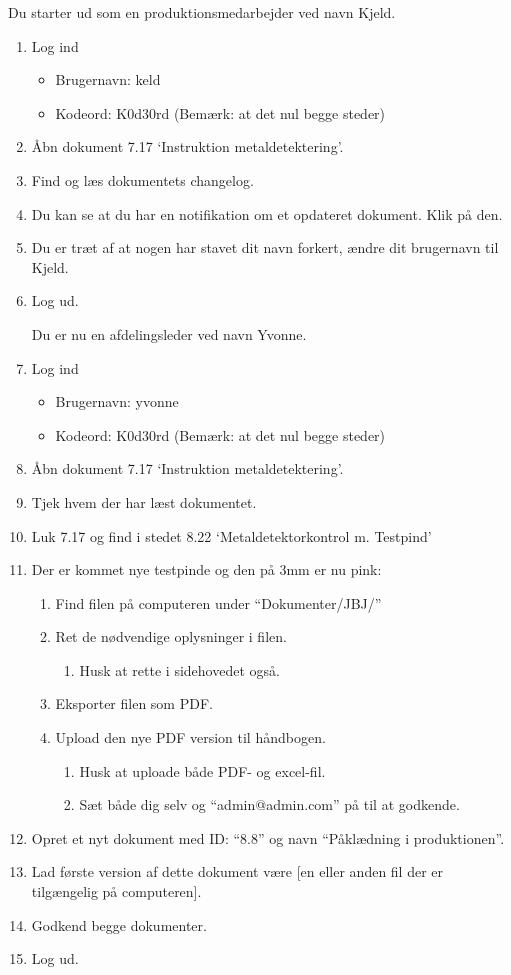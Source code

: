 Du starter ud som en produktionsmedarbejder ved navn Kjeld.
\begin{enumerate}
	\item Log ind
		\begin{itemize}
			\item Brugernavn: keld
			\item Kodeord: K0d30rd  (Bemærk: at det nul begge steder)
		\end{itemize}
	\item Åbn dokument 7.17 ‘Instruktion metaldetektering’.
	\item Find og læs dokumentets changelog.
	\item Du kan se at du har en notifikation om et opdateret dokument. Klik på den.
	\item Du er træt af at nogen har stavet dit navn forkert, ændre dit brugernavn til Kjeld.
	\item Log ud.

Du er nu en afdelingsleder ved navn Yvonne.
	\item Log ind
		\begin{itemize}
			\item Brugernavn: yvonne
			\item Kodeord: K0d30rd  (Bemærk: at det nul begge steder)
		\end{itemize}
	\item Åbn dokument 7.17 ‘Instruktion metaldetektering’.
	\item Tjek hvem der har læst dokumentet.
	\item Luk 7.17 og find i stedet 8.22 ‘Metaldetektorkontrol m. Testpind’
	\item Der er kommet nye testpinde og den på 3mm er nu pink:
		\begin{enumerate}
			\item Find filen på computeren under “Dokumenter/JBJ/”
			\item Ret de nødvendige oplysninger i filen.
			\begin{enumerate}
				\item Husk at rette i sidehovedet også.
			\end{enumerate}
		\item Eksporter filen som PDF.
		\item Upload den nye PDF version til håndbogen.
			\begin{enumerate}
				\item Husk at uploade både PDF- og excel-fil.
				\item Sæt både dig selv og “admin@admin.com” på til at godkende.
			\end{enumerate}
		\end{enumerate}
	\item Opret et nyt dokument med ID: “8.8” og navn “Påklædning i produktionen”.
	\item Lad første version af dette dokument være [en eller anden fil der er tilgængelig på computeren].
	\item Godkend begge dokumenter.
	\item Log ud.


\end{enumerate}
